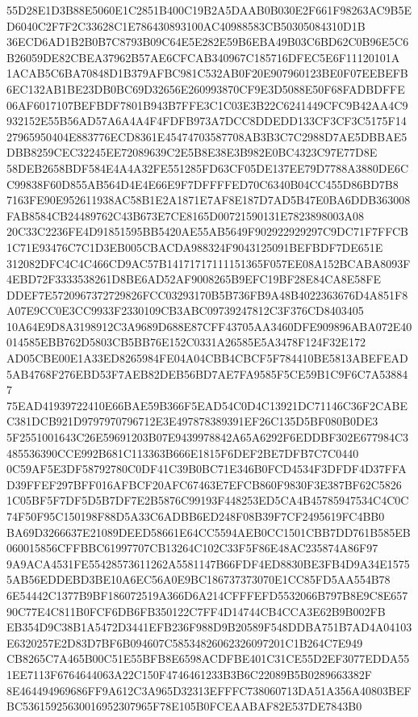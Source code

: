 \documentclass[UTF8,fontset=fandol,zihao=-4,a4paper]{ctexart}
\begin{document}
{{55D28E1D3B88E5060E1C2851B400C19B2A5DAAB0B030E2F661F98263AC9B5ED6040C2F7F2C33628C1E786430893100AC40988583CB50305084310D1B
36ECD6AD1B2B0B7C8793B09C64E5E282E59B6EBA49B03C6BD62C0B96E5C6B26059DE82CBEA37962B57AE6CFCAB340967C185716DFEC5E6F11120101A
1ACAB5C6BA70848D1B379AFBC981C532AB0F20E907960123BE0F07EEBEFB6EC132AB1BE23DB0BC69D32656E260993870CF9E3D5088E50F68FADBDFFE
06AF6017107BEFBDF7801B943B7FFE3C1C03E3B22C6241449CFC9B42AA4C9932152E55B56AD57A6A4A4F4FDFB973A7DCC8DDEDD133CF3CF3C5175F14
27965950404E883776ECD8361E45474703587708AB3B3C7C2988D7AE5DBBAE5DBB8259CEC32245EE72089639C2E5B8E38E3B982E0BC4323C97E77D8E
58DEB2658BDF584E4A4A32FE551285FD63CF05DE137EE79D7788A3880DE6CC99838F60D855AB564D4E4E66E9F7DFFFFED70C6340B04CC455D86BD7B8
7163FE90E952611938AC58B1E2A1871E7AF8E187D7AD5B47E0BA6DDB363008FAB8584CB24489762C43B673E7CE8165D00721590131E7823898003A08
20C33C2236FE4D91851595BB5420AE55AB5649F902922929297C9DC71F7FFCB1C71E93476C7C1D3EB005CBACDA988324F9043125091BEFBDF7DE651E
312082DFC4C4C466CD9AC57B14171717111151365F057EE08A152BCABA8093F4EBD72F3333538261D8BE6AD52AF9008265B9EFC19BF28E84CA8E58FE
DDEF7E5720967372729826FCC03293170B5B736FB9A48B4022363676D4A851F8A07E9CC0E3CC9933F2330109CB3ABC09739247812C3F376CD8403405
10A64E9D8A3198912C3A9689D688E87CFF43705AA3460DFE909896ABA072E40014585EBB762D5803CB5BB76E152C0331A26585E5A3478F124F32E172
AD05CBE00E1A33ED8265984FE04A04CBB4CBCF5F784410BE5813ABEFEAD5AB4768F276EBD53F7AEB82DEB56BD7AE7FA9585F5CE59B1C9F6C7A538847
75EAD41939722410E66BAE59B366F5EAD54C0D4C13921DC71146C36F2CABEC381DCB921D9797970796712E3E497878389391EF26C135D5BF080B0DE3
5F2551001643C26E59691203B07E9439978842A65A6292F6EDDBF302E677984C3485536390CCE992B681C113363B666E1815F6DEF2BE7DFB7C7C0440
0C59AF5E3DF58792780C0DF41C39B0BC71E346B0FCD4534F3DFDF4D37FFAD39FFEF297BFF016AFBCF20AFC67463E7EFCB860F9830F3E387BF62C5826
1C05BF5F7DF5D5B7DF7E2B5876C99193F448253ED5CA4B45785947534C4C0C74F50F95C150198F88D5A33C6ADBB6ED248F08B39F7CF2495619FC4BB0
BA69D3266637E21089DEED58661E64CC5594AEB0CC1501CBB7DD761B585EB060015856CFFBBC61997707CB13264C102C33F5F86E48AC235874A86F97
9A9ACA4531FE55428573611262A5581147B66FDF4ED8830BE3FB4D9A34E15755AB56EDDEBD3BE10A6EC56A0E9BC186737373070E1CC85FD5AA554B78
6E54442C1377B9BF186072519A366D6A214CFFFEFD5532066B797B8E9C8E65790C77E4C811B0FCF6DB6FB350122C7FF4D14744CB4CCA3E62B9B002FB
EB354D9C38B1A5472D3441EFB236F988D9B20589F548DDBA751B7AD4A04103E6320257E2D83D7BF6B094607C58534826062326097201C1B264C7E949
CB8265C7A465B00C51E55BFB8E6598ACDFBE401C31CE55D2EF3077EDDA551EE7113F6764644063A22C150F4746461233B3B6C22089B5B0289663382F
8E464494969686FF9A612C3A965D32313EFFFC738060713DA51A356A40803BEFBC53615925630016952307965F78E105B0FCEAABAF82E537DE7843B0
}}
\end{document}
